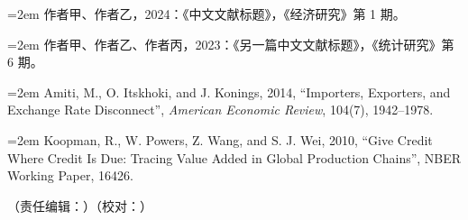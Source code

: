\documentclass[UTF8,a4paper,zihao=5,fontset=mac]{ctexart}
\newcommand{\ERJRef}[1]{%
  \par\noindent\hspace*{2em}\hangindent=2em\hangafter=1 {#1}\par%
}
\begin{document}
{\songti{}
\ERJRef{作者甲、作者乙，2024：《中文文献标题》，《经济研究》第 1 期。}
\ERJRef{作者甲、作者乙、作者丙，2023：《另一篇中文文献标题》，《统计研究》第 6 期。}
\ERJRef{Amiti, M., O. Itskhoki, and J. Konings, 2014, “Importers, Exporters, and Exchange Rate Disconnect”, \textit{American Economic Review}, 104(7), 1942--1978.}
\ERJRef{Koopman, R., W. Powers, Z. Wang, and S. J. Wei, 2010, “Give Credit Where Credit Is Due: Tracing Value Added in Global Production Chains”, NBER Working Paper, 16426.}
}

\vspace{2\baselineskip}
\begin{flushright}
（责任编辑：\underline{\hspace{4em}}）（校对：\underline{\hspace{4em}}）
\end{flushright}
\end{document}
